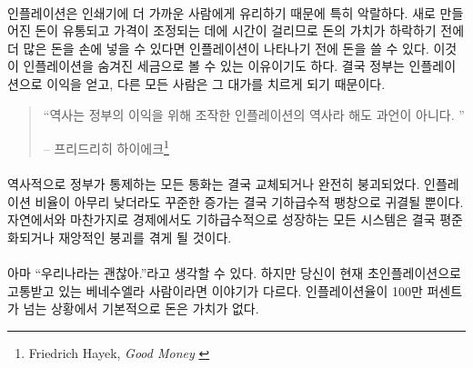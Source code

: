 \paragraph{}
인플레이션은 인쇄기에 더 가까운 사람에게 유리하기 때문에 특히 악랄하다. 
새로 만들어진 돈이 유통되고 가격이 조정되는 데에 시간이 걸리므로 
돈의 가치가 하락하기 전에 더 많은 돈을 손에 넣을 수 있다면 인플레이션이 나타나기 전에 돈을 쓸 수 있다. 
이것이 인플레이션을 숨겨진 세금으로 볼 수 있는 이유이기도 하다.
결국 정부는 인플레이션으로 이익을 얻고, 다른 모든 사람은 그 대가를 치르게 되기 때문이다.

\begin{quotation}\begin{samepage}
		\enquote{역사는 정부의 이익을 위해 조작한 인플레이션의 역사라 해도 과언이 아니다. }
		\begin{flushright} -- 프리드리히 하이에크\footnote{Friedrich Hayek, \textit{Good Money} \cite{hayek-good-money}}
\end{flushright}\end{samepage}\end{quotation}

\paragraph{}
역사적으로 정부가 통제하는 모든 통화는 결국 교체되거나 완전히 붕괴되었다. 
인플레이션 비율이 아무리 낮더라도 꾸준한 증가는 결국 기하급수적 팽창으로 귀결될 뿐이다. 
자연에서와 마찬가지로 경제에서도 기하급수적으로 성장하는 
모든 시스템은 결국 평준화되거나 재앙적인 붕괴를 겪게 될 것이다.

\paragraph{}
아마 \enquote{우리나라는 괜찮아.}라고 생각할 수 있다.
하지만 당신이 현재 초인플레이션으로 고통받고 있는 베네수엘라 사람이라면 이야기가 다르다.  
인플레이션율이 100만 퍼센트가 넘는 상황에서 기본적으로 돈은 가치가 없다.\cite{wiki:venezuela}

